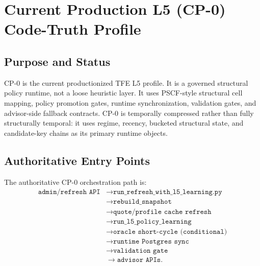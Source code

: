 \chapter{Current Production L5 (CP-0) Code-Truth Profile}
\section{Purpose and Status}

CP-0 is the current productionized TFE L5 profile. It is a governed structural policy runtime, not a loose heuristic layer. It uses PSCF-style structural cell mapping, policy promotion gates, runtime synchronization, validation gates, and advisor-side fallback contracts. CP-0 is temporally compressed rather than fully structurally temporal: it uses regime, recency, bucketed structural state, and candidate-key chains as its primary runtime objects.

\section{Authoritative Entry Points}

The authoritative CP-0 orchestration path is:
\begin{align*}
\texttt{admin/refresh API} &\rightarrow \texttt{run\_refresh\_with\_l5\_learning.py} \\
&\rightarrow \texttt{rebuild\_snapshot} \\
&\rightarrow \texttt{quote/profile cache refresh} \\
&\rightarrow \texttt{run\_l5\_policy\_learning} \\
&\rightarrow \texttt{oracle short-cycle (conditional)} \\
&\rightarrow \texttt{runtime Postgres sync} \\
&\rightarrow \texttt{validation gate} \\
&\rightarrow \texttt{advisor APIs}.
\end{align*}

